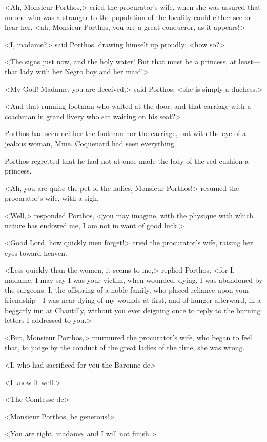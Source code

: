 <Ah, Monsieur Porthos,> cried the procurator's wife, when she was assured that no one who was a stranger to the population of the locality could either see or hear her, <ah, Monsieur Porthos, you are a great conqueror, as it appears!> 

<I, madame?> said Porthos, drawing himself up proudly; <how so?> 

<The signs just now, and the holy water! But that must be a princess, at least---that lady with her Negro boy and her maid!> 

<My God! Madame, you are deceived,> said Porthos; <she is simply a duchess.> 

<And that running footman who waited at the door, and that carriage with a coachman in grand livery who sat waiting on his seat?> 

Porthos had seen neither the footman nor the carriage, but with the eye of a jealous woman, Mme. Coquenard had seen everything. 

Porthos regretted that he had not at once made the lady of the red cushion a princess. 

<Ah, you are quite the pet of the ladies, Monsieur Porthos!> resumed the procurator's wife, with a sigh. 

<Well,> responded Porthos, <you may imagine, with the physique with which nature has endowed me, I am not in want of good luck.> 

<Good Lord, how quickly men forget!> cried the procurator's wife, raising her eyes toward heaven. 

<Less quickly than the women, it seems to me,> replied Porthos; <for I, madame, I may say I was your victim, when wounded, dying, I was abandoned by the surgeons. I, the offspring of a noble family, who placed reliance upon your friendship---I was near dying of my wounds at first, and of hunger afterward, in a beggarly inn at Chantilly, without you ever deigning once to reply to the burning letters I addressed to you.> 

<But, Monsieur Porthos,> murmured the procurator's wife, who began to feel that, to judge by the conduct of the great ladies of the time, she was wrong. 

<I, who had sacrificed for you the Baronne de\longdash> 

<I know it well.> 

<The Comtesse de\longdash> 

<Monsieur Porthos, be generous!> 

<You are right, madame, and I will not finish.> 

